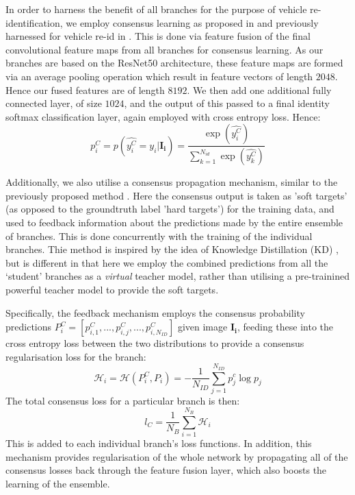 \documentclass[10pt,twocolumn,letterpaper]{article}
\begin{document}
In order to harness the benefit of all branches for the purpose of vehicle re-identification, we employ consensus learning as proposed in \cite{chen2017person} and previously harnessed for vehicle re-id in \cite{kanaci2018vehicle}. This is done via feature fusion of the final convolutional feature maps from all branches for consensus learning. As our branches are based on the ResNet50 architecture, these feature maps are formed via an average pooling operation which result in feature vectors of length $2048$. Hence our fused features are of length $8192$. We then add one additional fully connected layer, of size $1024$, and the output of this passed to a final identity softmax classification layer, again employed with cross entropy loss. Hence:
\begin{equation}
  p_i^C = p(\hat{y_i^C} = y_i|\mathbf{I_i}) = \frac{\exp(\hat{y_i^C})}{\sum_{k=1}^{N_{id}}\exp(\hat{y_k^C})}
\end{equation}

Additionally, we also utilise a consensus propagation mechanism, similar to the previously proposed method \cite{chen2017person,kanaci2018vehicle}. Here the consensus output is taken as 'soft targets' (as opposed to the groundtruth label 'hard targets') for the training data, and used to feedback information about the predictions made by the entire ensemble of branches. This is done concurrently with the training of the individual branches. Thie method is inspired by the idea of Knowledge Distillation (KD) \cite{hinton2015distilling}, but is different in that here we employ the combined predictions from all the `student' branches as a \emph{virtual} teacher model, rather than utilising a pre-trainined powerful teacher model to provide the soft targets.

Specifically, the feedback mechanism employs the consensus probability predictions $P^C_i = \left[p_{i,1}^C,...,p_{i,j}^C,...,p_{i,N_{ID}}^C\right]$ given image $\mathbf{I_i}$, feeding these into the cross entropy loss between the two distributions to provide a consensus regularisation loss for the branch:
\begin{equation}
  \mathcal{H}_i = \mathcal{H}(P^C_i, P_i) = -\frac{1}{N_{ID}}\sum_{j=1}^{N_{ID}} p_j^c \log{p_j}
\end{equation}
The total consensus loss for a particular branch is then:
\begin{equation}
  l_{C} = \frac{1}{N_B} \sum_{i=1}^{N_B} \mathcal{H}_i
\end{equation}
This is added to each individual branch's loss functions. In addition, this mechanism provides regularisation of the whole network by propagating all of the consensus losses back through the feature fusion layer, which also boosts the learning of the ensemble.
\end{document}
